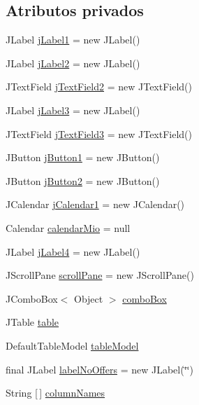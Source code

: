 \subsection*{Atributos privados}
\begin{DoxyCompactItemize}
\item 
J\+Label \mbox{\hyperlink{classgui_1_1_query_availability_g_u_i_a78193c8fc1d276556b8bf6588c8b001d}{j\+Label1}} = new J\+Label()
\item 
J\+Label \mbox{\hyperlink{classgui_1_1_query_availability_g_u_i_af08ae2b6de897ece4fc97bca2985be79}{j\+Label2}} = new J\+Label()
\item 
J\+Text\+Field \mbox{\hyperlink{classgui_1_1_query_availability_g_u_i_a66e9188aba0953b1351d11ff8019583c}{j\+Text\+Field2}} = new J\+Text\+Field()
\item 
J\+Label \mbox{\hyperlink{classgui_1_1_query_availability_g_u_i_ad0e46911f17f831ea3b90dd9c789cd69}{j\+Label3}} = new J\+Label()
\item 
J\+Text\+Field \mbox{\hyperlink{classgui_1_1_query_availability_g_u_i_a330893db57be56c4b286eae0fe93392f}{j\+Text\+Field3}} = new J\+Text\+Field()
\item 
J\+Button \mbox{\hyperlink{classgui_1_1_query_availability_g_u_i_a91b2e2bb1209a1c5ed740ee6d36e61d5}{j\+Button1}} = new J\+Button()
\item 
J\+Button \mbox{\hyperlink{classgui_1_1_query_availability_g_u_i_a23f23d77b23f7647d5dbbc3ced262a35}{j\+Button2}} = new J\+Button()
\item 
J\+Calendar \mbox{\hyperlink{classgui_1_1_query_availability_g_u_i_ad49fbf793d6741017c225cdb8c990e57}{j\+Calendar1}} = new J\+Calendar()
\item 
Calendar \mbox{\hyperlink{classgui_1_1_query_availability_g_u_i_a094aec8eab55dfacb616cb54f9a1176e}{calendar\+Mio}} = null
\item 
J\+Label \mbox{\hyperlink{classgui_1_1_query_availability_g_u_i_a95ee33d80af86f083141251d710c8aa3}{j\+Label4}} = new J\+Label()
\item 
J\+Scroll\+Pane \mbox{\hyperlink{classgui_1_1_query_availability_g_u_i_a897b97b35fa12333a40c1f043ae8568c}{scroll\+Pane}} = new J\+Scroll\+Pane()
\item 
J\+Combo\+Box$<$ Object $>$ \mbox{\hyperlink{classgui_1_1_query_availability_g_u_i_a5989d89c6130766901bc7f67969c8593}{combo\+Box}}
\item 
J\+Table \mbox{\hyperlink{classgui_1_1_query_availability_g_u_i_a2e6528d7f7770e0944180aff2a4379a7}{table}}
\item 
Default\+Table\+Model \mbox{\hyperlink{classgui_1_1_query_availability_g_u_i_a15b4031f3c2de96f0c28c9405a9f2f0d}{table\+Model}}
\item 
final J\+Label \mbox{\hyperlink{classgui_1_1_query_availability_g_u_i_abff167ce816f1e66d905be0a65c6c6b8}{label\+No\+Offers}} = new J\+Label(\char`\"{}\char`\"{})
\item 
String \mbox{[}$\,$\mbox{]} \mbox{\hyperlink{classgui_1_1_query_availability_g_u_i_af7a80f63b92c4e0d8727753c61d0f87f}{column\+Names}}
\end{DoxyCompactItemize}
